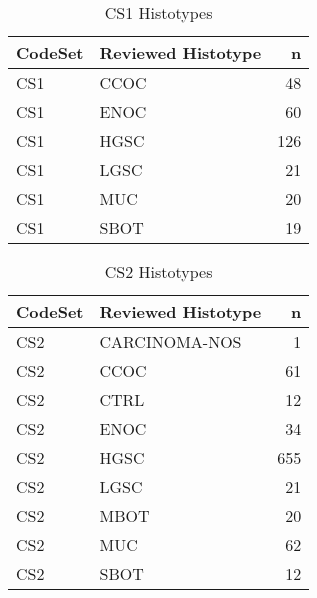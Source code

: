 \documentclass[
]{report}
\begin{document}
\begin{table}

\caption{\label{tab:dist-cs1}CS1 Histotypes}
\centering
\begin{tabular}[t]{l|l|r}
\hline
CodeSet & Reviewed Histotype & n\\
\hline
CS1 & CCOC & 48\\
\hline
CS1 & ENOC & 60\\
\hline
CS1 & HGSC & 126\\
\hline
CS1 & LGSC & 21\\
\hline
CS1 & MUC & 20\\
\hline
CS1 & SBOT & 19\\
\hline
\end{tabular}
\end{table}

\begin{table}

\caption{\label{tab:dist-cs2}CS2 Histotypes}
\centering
\begin{tabular}[t]{l|l|r}
\hline
CodeSet & Reviewed Histotype & n\\
\hline
CS2 & CARCINOMA-NOS & 1\\
\hline
CS2 & CCOC & 61\\
\hline
CS2 & CTRL & 12\\
\hline
CS2 & ENOC & 34\\
\hline
CS2 & HGSC & 655\\
\hline
CS2 & LGSC & 21\\
\hline
CS2 & MBOT & 20\\
\hline
CS2 & MUC & 62\\
\hline
CS2 & SBOT & 12\\
\hline
\end{tabular}
\end{table}
\end{document}
